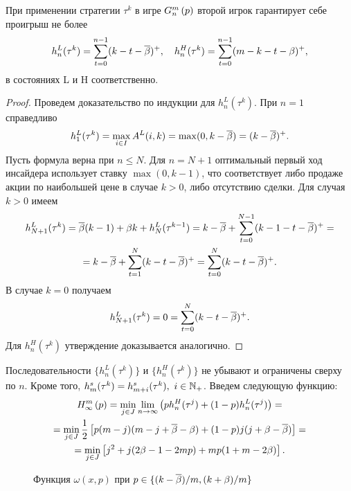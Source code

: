 {\begin{proposition}
  \label{ch1:prop:secondPlayerStrategyPayoffs}
  При применении стратегии $\tau^k$ в игре $G_{n}^m\left({p}\right)$ второй игрок гарантирует себе проигрыш не более
  \[
    h_n^L(\tau^k) = \sum_{t=0}^{n-1}(k - t - {\overline{\beta}})^+, \quad h_n^H(\tau^k) =
    \sum_{t=0}^{n-1}(m - k - t - \beta)^+,
  \]
  в состояниях L и H соответственно.
\end{proposition}
\begin{proof}
  Проведем доказательство по индукции для $h^L_n(\tau^k)$.
  При $n=1$ справедливо
  \[
    h^L_1(\tau^k) = \max_{i \in I} A^L(i, k) = \max(0, k - {\overline{\beta}}) = (k - {\overline{\beta}})^+.
  \]
  Пусть формула верна при $n \leq N$. Для $n=N+1$ оптимальный первый ход инсайдера использует ставку $\max(0, k - 1)$, что соответствует либо продаже
  акции по наибольшей цене в случае $k > 0$, либо отсутствию сделки. 
  Для случая $k > 0$ имеем
  \begin{gather*}
    h^L_{N+1}(\tau^k) = {\overline{\beta}} (k-1) + \beta k + h^L_N(\tau^{k-1}) =
    k - {\overline{\beta}} + \sum_{t=0}^{N-1}(k - 1 - t - {\overline{\beta}})^+ = \\
    = k - {\overline{\beta}} + \sum_{t=1}^N(k-t-{\overline{\beta}})^+ = \sum_{t=0}^N(k-t-{\overline{\beta}})^+.
  \end{gather*}
  В случае $k = 0$ получаем
  \begin{gather*}
    h^L_{N+1}(\tau^k) = 0 = \sum_{t=0}^N(k-t-{\overline{\beta}})^+.
  \end{gather*}
  Для $h^H_n(\tau^k)$ утверждение доказывается аналогично.
\end{proof}

Последовательности $\{h_n^L(\tau^k)\}$ и $\{h_n^H(\tau^k)\}$ не убывают и ограничены сверху по $n$.
Кроме того,
$h^s_m(\tau^k) = h^s_{m+i}(\tau^k),\ i \in \mathbb{N}_+$.
Введем следующую функцию:
\begin{multline*}
  H_{\infty}^m\left({p}\right) 
  = \min_{j \in J} \lim_{n \rightarrow \infty}\left(
    ph_n^H(\tau^j) + (1-p)h_n^L(\tau^j)
  \right) = \\
  = \min_{j \in J} \frac{1}{2} \left[ p (m - j)(m - j + {\overline{\beta}} - \beta) + (1 - p)j(j + \beta
    - {\overline{\beta}}) \right] = \\
  = \min_{j \in J} \left[ j^2 + j(2\beta - 1 - 2 m p) + m p (1 + m - 2\beta) \right].
\end{multline*}

\begin{figure}[thb]
  \centering
  
  \caption{Функция $\omega(x,p)$ при $p \in \{(k-{\overline{\beta}})/m, (k+\beta)/m\}$}
  \label{ch1:fig:omega(x,p)}
\end{figure}

}
